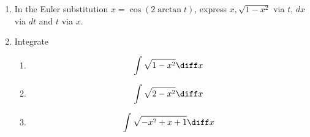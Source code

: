 \begin{enumerate}
\item In the Euler substitution $x=\cos (2\arctan t)$, express  $x,\sqrt{1-x^2} $ via $t$, $dx$ via $dt$ and $t$ via $x$.
\item Integrate
\begin{enumerate}
\item 
\[
\int \sqrt{1-x^2}\diff x
\]
\item 
\[
\int \sqrt{2-x^2}\diff x
\]
\item 
\[
\int \sqrt{-x^2+x+1}\diff x
\]
\end{enumerate}


\end{enumerate}
